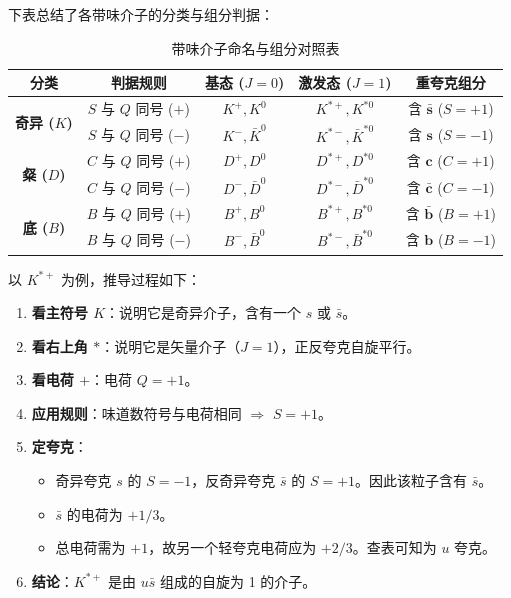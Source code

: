 下表总结了各带味介子的分类与组分判据：
\begin{table}[H]
    \centering
    \renewcommand{\arraystretch}{1.3}
    \small
    \begin{tabular}{|c|c|c|c|c|}
    \hline
    \textbf{分类} & \textbf{判据规则} & \textbf{基态 ($J=0$)} & \textbf{激发态 ($J=1$)} & \textbf{重夸克组分} \\ \hline
    \multirow{2}{*}{\textbf{奇异 ($K$)}} & $S$ 与 $Q$ 同号 ($+$) & $K^+, K^0$ & $K^{*+}, K^{*0}$ & 含 $\mathbf{\bar{s}}$ ($S=+1$) \\ \cline{2-5}
                                       & $S$ 与 $Q$ 同号 ($-$) & $K^-, \bar{K}^0$ & $K^{*-}, \bar{K}^{*0}$ & 含 $\mathbf{s}$ ($S=-1$) \\ \hline
    \multirow{2}{*}{\textbf{粲 ($D$)}} & $C$ 与 $Q$ 同号 ($+$) & $D^+, D^0$ & $D^{*+}, D^{*0}$ & 含 $\mathbf{c}$ ($C=+1$) \\ \cline{2-5}
                                      & $C$ 与 $Q$ 同号 ($-$) & $D^-, \bar{D}^0$ & $D^{*-}, \bar{D}^{*0}$ & 含 $\mathbf{\bar{c}}$ ($C=-1$) \\ \hline
    \multirow{2}{*}{\textbf{底 ($B$)}} & $B$ 与 $Q$ 同号 ($+$) & $B^+, B^0$ & $B^{*+}, B^{*0}$ & 含 $\mathbf{\bar{b}}$ ($B=+1$) \\ \cline{2-5}
                                      & $B$ 与 $Q$ 同号 ($-$) & $B^-, \bar{B}^0$ & $B^{*-}, \bar{B}^{*0}$ & 含 $\mathbf{b}$ ($B=-1$) \\ \hline
    \end{tabular}
    \caption{带味介子命名与组分对照表}
\end{table}

\begin{example}
    以 $K^{*+}$ 为例，推导过程如下：
\begin{enumerate}
    \item \textbf{看主符号 $K$}：说明它是奇异介子，含有一个 $s$ 或 $\bar{s}$。
    \item \textbf{看右上角 $*$}：说明它是矢量介子（$J=1$），正反夸克自旋平行。
    \item \textbf{看电荷 $+$}：电荷 $Q=+1$。
    \item \textbf{应用规则}：味道数符号与电荷相同 $\Rightarrow$ $S = +1$。
    \item \textbf{定夸克}：
    \begin{itemize}
        \item 奇异夸克 $s$ 的 $S=-1$，反奇异夸克 $\bar{s}$ 的 $S=+1$。因此该粒子含有 \textbf{$\bar{s}$}。
        \item $\bar{s}$ 的电荷为 $+1/3$。
        \item 总电荷需为 $+1$，故另一个轻夸克电荷应为 $+2/3$。查表可知为 $u$ 夸克。
    \end{itemize}
    \item \textbf{结论}：$K^{*+}$ 是由 \textbf{$u\bar{s}$} 组成的自旋为 1 的介子。
\end{enumerate}
\end{example}

